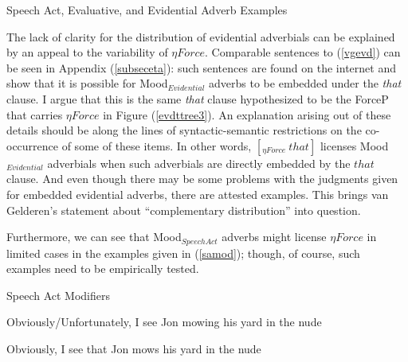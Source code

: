 \documentclass[11pt]{article}
\begin{document}
\begin{exe}
\ex {} Speech Act, Evaluative, and Evidential Adverb Examples\label{vangeld}
\begin{xlist}
\ex
\begin{xlist}
\end{xlist}
\label{vgevd}
\end{xlist}
\end{exe}

The lack of clarity for the distribution of evidential adverbials can be explained by an appeal to the variability of $\eta Force$. Comparable sentences to (\ref{vgevd}) can be seen in Appendix (\ref{subseceta}): such sentences are found on the internet and show that it is possible for Mood$_{Evidential}$ adverbs to be embedded under the {\sl that} clause. I argue that this is the same {\sl that} clause hypothesized to be the ForceP that carries $\eta Force$ in Figure (\ref{evdttree3}). An explanation arising out of these details should be along the lines of syntactic-semantic restrictions on the co-occurrence of some of these items. In other words, $[_{\eta Force} \ that]$ licenses Mood$_{Evidential}$ adverbials when such adverbials are directly embedded by the $that$ clause. And even though there may be some problems with the judgments given for embedded evidential adverbs, there are attested examples. This brings van Gelderen's statement about ``complementary distribution'' into question.  

Furthermore, we can see that Mood$_{Speech Act}$ adverbs might license $\eta Force$ in limited cases in the examples given in (\ref{samod}); though, of course, such examples need to be empirically tested.

\begin{exe}
\ex Speech Act Modifiers\label{samod}

\begin{xlist}
\ex Obviously/Unfortunately, I see Jon mowing his yard in the nude
\begin{xlist}
\ex Obviously, I see that Jon mows his yard in the nude
\end{xlist}

\begin{xlist}
\end{xlist}
\end{xlist}
\end{exe}
\end{document}
